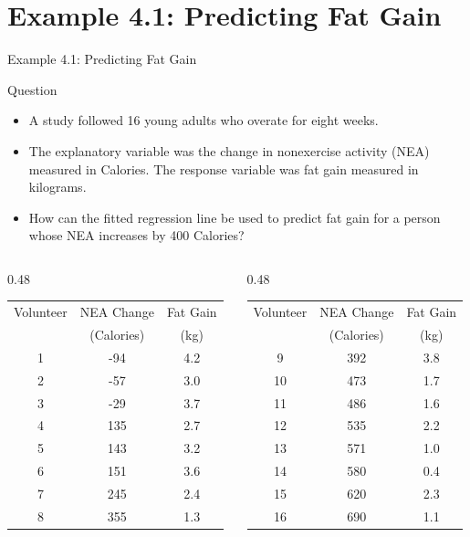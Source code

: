 \documentclass[aspectratio=169]{beamer}
\begin{document}
\section{Example 4.1: Predicting Fat Gain}
\begin{frame}{Example 4.1: Predicting Fat Gain}
\scriptsize
\begin{block}{Question}
\begin{itemize}
	\item A study followed 16 young adults who overate for eight weeks.
	\item The explanatory variable was the change in nonexercise activity (NEA) measured in Calories. The response variable was fat gain measured in kilograms.
	\item How can the fitted regression line be used to predict fat gain for a person whose NEA increases by 400 Calories?
\end{itemize}
\end{block}

\begin{columns}[T]
\begin{column}{0.48\textwidth}
\centering
\begin{tabular}{ccc}
\toprule
Volunteer & NEA Change & Fat Gain \\
 & (Calories) & (kg) \\
\midrule
1 & -94 & 4.2 \\
2 & -57 & 3.0 \\
3 & -29 & 3.7 \\
4 & 135 & 2.7 \\
5 & 143 & 3.2 \\
6 & 151 & 3.6 \\
7 & 245 & 2.4 \\
8 & 355 & 1.3 \\
\bottomrule
\end{tabular}
\end{column}
\begin{column}{0.48\textwidth}
\centering
\begin{tabular}{ccc}
\toprule
Volunteer & NEA Change & Fat Gain \\
 & (Calories) & (kg) \\
\midrule
9 & 392 & 3.8 \\
10 & 473 & 1.7 \\
11 & 486 & 1.6 \\
12 & 535 & 2.2 \\
13 & 571 & 1.0 \\
14 & 580 & 0.4 \\
15 & 620 & 2.3 \\
16 & 690 & 1.1 \\
\bottomrule
\end{tabular}
\end{column}
\end{columns}
\end{frame}
\end{document}
